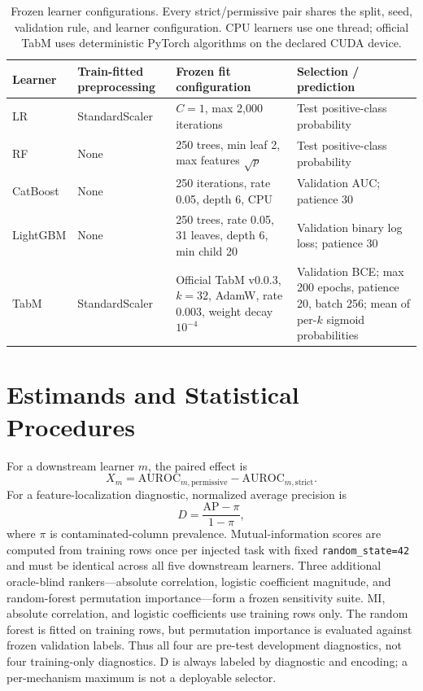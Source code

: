 \documentclass[letterpaper]{article}
\begin{document}
\begin{table}[t]
\centering
\scriptsize
\setlength{\tabcolsep}{3pt}
\begin{tabular}{@{}p{}p{}p{}p{}@{}}
\toprule
Learner & Train-fitted preprocessing & Frozen fit configuration & Selection / prediction \\
\midrule
LR & StandardScaler & $C=1$, max 2,000 iterations & Test positive-class probability \\
RF & None & 250 trees, min leaf 2, max features $\sqrt{p}$ & Test positive-class probability \\
CatBoost & None & 250 iterations, rate 0.05, depth 6, CPU & Validation AUC; patience 30 \\
LightGBM & None & 250 trees, rate 0.05, 31 leaves, depth 6, min child 20 &
Validation binary log loss; patience 30 \\
TabM & StandardScaler & Official TabM v0.0.3, $k=32$, AdamW, rate 0.003,
weight decay $10^{-4}$ & Validation BCE; max 200 epochs, patience 20, batch
256; mean of per-$k$ sigmoid probabilities \\
\bottomrule
\end{tabular}
\caption{Frozen learner configurations.  Every strict/permissive pair shares
the split, seed, validation rule, and learner configuration.  CPU learners use
one thread; official TabM uses deterministic PyTorch algorithms on the declared
CUDA device.}
\label{tab:model-configurations}
\end{table}

\section{Estimands and Statistical Procedures}
For a downstream learner $m$, the paired effect is
\begin{equation}
X_m = \mathrm{AUROC}_{m,\mathrm{permissive}}
      -\mathrm{AUROC}_{m,\mathrm{strict}}.
\end{equation}
For a feature-localization diagnostic, normalized average precision is
\begin{equation}
D = \frac{\mathrm{AP}-\pi}{1-\pi},
\end{equation}
where $\pi$ is contaminated-column prevalence.  Mutual-information scores are
computed from training rows once per injected task with fixed
\texttt{random\_state=42} and must be identical across all five downstream
learners.  Three additional oracle-blind rankers---absolute
correlation, logistic coefficient magnitude, and random-forest permutation
importance---form a frozen sensitivity suite.  MI, absolute correlation, and
logistic coefficients use training rows only.  The random forest is fitted on
training rows, but permutation importance is evaluated against frozen
validation labels.  Thus all four are pre-test development diagnostics, not
four training-only diagnostics.  D is always labeled by diagnostic and encoding; a
per-mechanism maximum is not a deployable selector.
\end{document}
